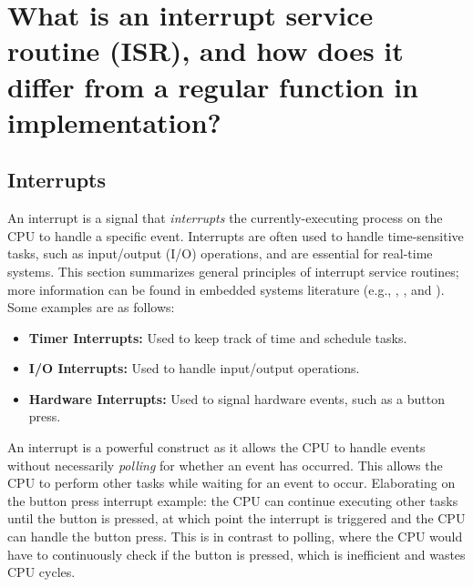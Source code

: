 \documentclass[main.tex]{subfiles}
\begin{document}
\section{What is an interrupt service routine (ISR), and how does it differ from a regular function in implementation?}

\spoilerline

\subsection{Interrupts}
An interrupt is a signal that \textit{interrupts} the currently-executing process on the CPU to handle a specific event. Interrupts are often used to handle time-sensitive tasks, such as input/output (I/O) operations, and are essential for real-time systems. This section summarizes general principles of interrupt service routines; more information can be found in embedded systems literature (e.g., \cite{white2024}, \cite{myersInterrupts}, and \cite{BetterEmbeddedSystemSoftware}).
Some examples are as follows:
\begin{itemize}
    \item \textbf{Timer Interrupts:} Used to keep track of time and schedule tasks.
    \item \textbf{I/O Interrupts:} Used to handle input/output operations.
    \item \textbf{Hardware Interrupts:} Used to signal hardware events, such as a button press.
\end{itemize}
\noindent An interrupt is a powerful construct as it allows the CPU to handle events without necessarily \textit{polling} for whether an event has occurred. This allows the CPU to perform other tasks while waiting for an event to occur. \newline
\newline
\noindent Elaborating on the button press interrupt example: the CPU can continue executing other tasks until the button is pressed, at which point the interrupt is triggered and the CPU can handle the button press. This is in contrast to polling, where the CPU would have to continuously check if the button is pressed, which is inefficient and wastes CPU cycles.
\end{document}
